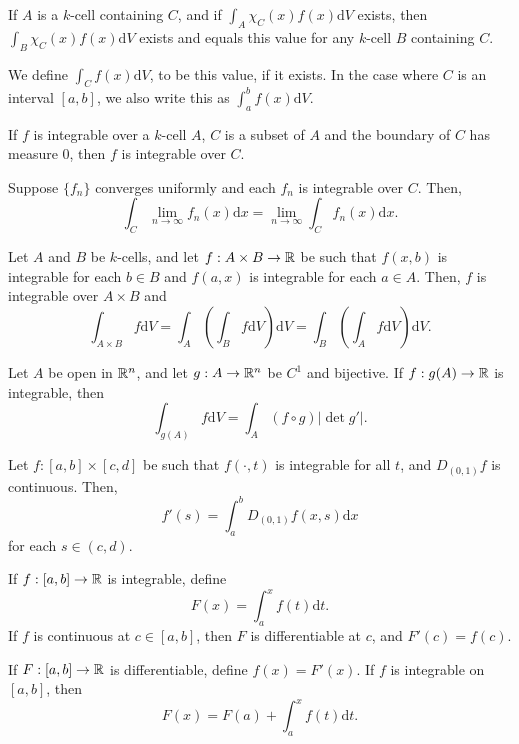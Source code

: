 \begin{cor}
    If $A$ is a $k$-cell containing $C$, and if
    $\int_A\chi_C(x)f(x)\mathrm dV$ exists, then $\int_B\chi_C(x)f(x)\mathrm dV$
    exists and equals this value for any $k$-cell $B$ containing $C$.
\end{cor}
\begin{defn}
    We define $\int_C f(x)\mathrm dV$, to be this value, if it exists. In the
    case where $C$ is an interval $[a,b]$, we also write this as $\int_a^b
    f(x)\mathrm dV$.
\end{defn}
\begin{prop}
    If $f$ is integrable over a $k$-cell $A$, $C$ is a subset of $A$ and the
    boundary of $C$ has measure $0$, then $f$ is integrable over $C$.
\end{prop}
\begin{prop}
    Suppose $\{f_n\}$ converges uniformly and each $f_n$ is integrable over $C$. Then,
    \[\int_C\lim_{n\to\infty} f_n(x)\mathrm dx=\lim_{n\to\infty}\int_C
    f_n(x)\mathrm dx.\]
\end{prop}
\begin{thm}[Fubini]
    Let $A$ and $B$ be $k$-cells, and let $f:A\times B\to\mathbb{R}$ be such that
    $f(x,b)$ is integrable for each $b\in B$ and $f(a,x)$ is integrable for each
    $a\in A$. Then, $f$ is integrable over $A\times B$ and
    \[\int_{A\times B}f\mathrm dV=\int_A\left(\int_B f\mathrm dV\right)\mathrm
    dV=\int_B\left(\int_A f\mathrm dV\right)\mathrm dV.\]
\end{thm}
\begin{thm}
    Let $A$ be open in $\mathbb{R}^n$, and let $g:A\to\mathbb{R}^n$ be $C^1$ and bijective.
    If $f:g(A)\to\mathbb{R}$ is integrable, then
    \[\int_{g(A)}f\mathrm dV=\int_A(f\circ g)|\det g'|.\]
\end{thm}
\begin{thm}
    Let $f:[a,b]\times[c,d]$ be such that $f(\cdot,t)$
    is integrable for all $t$, and $D_{(0,1)}f$ is continuous. Then, 
    \[f'(s)=\int_a^b D_{(0,1)}f(x,s)\mathrm dx\]
    for each $s\in(c,d)$.
\end{thm}
\begin{thm}
    If $f:[a,b]\to\mathbb{R}$ is integrable, define
    \[F(x)=\int_a^x f(t)\mathrm dt.\]
    If $f$ is continuous at $c\in[a,b]$, then $F$ is differentiable at $c$, and
    $F'(c)=f(c)$.

    If $F:[a,b]\to\mathbb{R}$ is differentiable, define $f(x)=F'(x)$. If $f$ is
    integrable on $[a,b]$, then \[F(x)=F(a)+\int_a^x f(t)\mathrm dt.\]
\end{thm}
